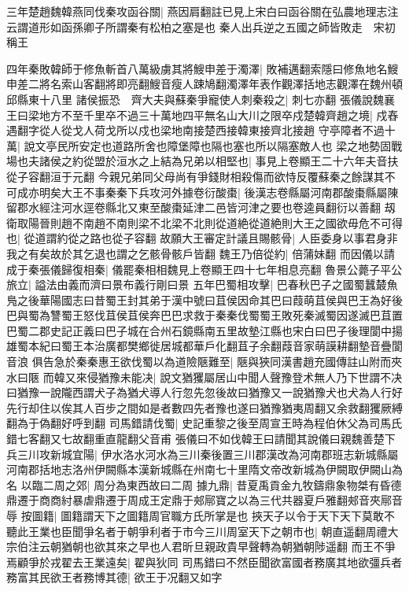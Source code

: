 三年楚趙魏韓燕同伐秦攻函谷關|{
	燕因肩翻註已見上宋白曰函谷關在弘農地理志注云謂道形如函孫卿子所謂秦有松柏之塞是也}
秦人出兵逆之五國之師皆敗走　宋初稱王

四年秦敗韓師于修魚斬首八萬級虜其將䱸申差于濁澤|{
	敗補邁翻索隱曰修魚地名䱸申差二將名索山客翻將即亮翻䱸音瘦人踈鳩翻濁澤年表作觀澤括地志觀澤在魏州頓邱縣東十八里}
諸侯振恐　齊大夫與蘇秦爭寵使人刺秦殺之|{
	刺七亦翻}
張儀說魏襄王曰梁地方不至千里卒不過三十萬地四平無名山大川之限卒戍楚韓齊趙之境|{
	戍舂遇翻字從人從戈人荷戈所以戍也梁地南接楚西接韓東接齊北接趙}
守亭障者不過十萬|{
	說文亭民所安定也道路所舍也障堡障也隔也塞也所以隔塞敵人也}
梁之地勢固戰場也夫諸侯之約從盟於洹水之上結為兄弟以相堅也|{
	事見上卷顯王二十六年夫音扶從子容翻洹于元翻}
今親兄弟同父母尚有爭錢財相殺傷而欲恃反覆蘇秦之餘謀其不可成亦明矣大王不事秦秦下兵攻河外據卷衍酸棗|{
	後漢志卷縣屬河南郡酸棗縣屬陳留郡水經注河水逕卷縣北又東至酸棗延津二邑皆河津之要也卷逵員翻衍以善翻}
刼衛取陽晉則趙不南趙不南則梁不北梁不北則從道絶從道絶則大王之國欲毋危不可得也|{
	從道謂約從之路也從子容翻}
故願大王審定計議且賜骸骨|{
	人臣委身以事君身非我之有矣故於其乞退也謂之乞骸骨骸戶皆翻}
魏王乃倍從約|{
	倍蒲妹翻}
而因儀以請成于秦張儀歸復相秦|{
	儀罷秦相相魏見上卷顯王四十七年相息亮翻}
魯景公薨子平公旅立|{
	謚法由義而濟曰景布義行剛曰景}
五年巴蜀相攻擊|{
	巴春秋巴子之國蜀蠶樷魚鳬之後華陽國志曰昔蜀王封其弟于漢中號曰苴侯因命其巴曰葭萌苴侯與巴王為好後巴與蜀為讐蜀王怒伐苴侯苴侯奔巴巴求救于秦秦伐蜀蜀王敗死秦滅蜀因遂滅巴苴置巴蜀二郡史記正義曰巴子城在合州石鏡縣南五里故墊江縣也宋白曰巴子後理閬中揚雄蜀本紀曰蜀王本治廣都樊鄉徙居城都華戶化翻苴子余翻葭音家萌謨耕翻墊音疊閬音浪}
俱告急於秦秦惠王欲伐蜀以為道險陿難至|{
	陿與狹同漢書趙充國傳註山附而夾水曰陿}
而韓又來侵猶豫未能决|{
	說文猶玃屬居山中聞人聲豫登术無人乃下世謂不决曰猶豫一說隴西謂犬子為猶犬導人行忽先忽後故曰猶豫又一說猶豫犬也犬為人行好先行却住以俟其人百步之間如是者數四先者豫也遂曰猶豫猶夷周翻又余救翻玃厥縛翻為于偽翻好呼到翻}
司馬錯請伐蜀|{
	史記重黎之後至周宣王時為程伯休父為司馬氏錯七客翻又七故翻重直龍翻父音甫}
張儀曰不如伐韓王曰請聞其說儀曰親魏善楚下兵三川攻新城宜陽|{
	伊水洛水河水為三川秦後置三川郡漢改為河南郡班志新城縣屬河南郡括地志洛州伊闕縣本漢新城縣在州南七十里隋文帝改新城為伊闕取伊闕山為名}
以臨二周之郊|{
	周分為東西故曰二周}
據九鼎|{
	昔夏禹貢金九牧鑄鼎象物桀有昏德鼎遷于商商紂暴虐鼎遷于周成王定鼎于郟鄏寶之以為三代共器夏戶雅翻郟音夾鄏音辱}
按圖籍|{
	圖籍謂天下之圖籍周官職方氏所掌是也}
挾天子以令于天下天下莫敢不聽此王業也臣聞爭名者于朝爭利者于市今三川周室天下之朝市也|{
	朝直遥翻周禮大宗伯注云朝猶朝也欲其來之早也人君昕旦親政貴早聲轉為朝猶朝陟遥翻}
而王不爭焉顧爭於戎翟去王業遠矣|{
	翟與狄同}
司馬錯曰不然臣聞欲富國者務廣其地欲彊兵者務富其民欲王者務博其德|{
	欲王于况翻又如字}
